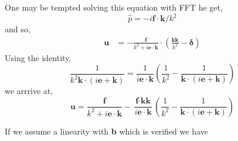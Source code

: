 One may be tempted solving this equation with FFT he get,
\begin{equation}
    \hat{p} = - i \textbf{f}\cdot \textbf{k} / k^2
\end{equation}
and so,
\begin{align}
    \textbf{u}
    &= -\frac{\textbf{f}}{k^2  + i \textbf{e}\cdot \textbf{k}}\cdot (\frac{\textbf{kk}}{k^2} - \bm\delta)
\end{align}
Using the identity,
\begin{equation}
    \frac{1}{k^2 \textbf{k}\cdot (i\textbf{e} + \textbf{k})}
    =\frac{1}{i\textbf{e}\cdot \textbf{k}}\left(\frac{1}{k^2} - \frac{1}{\textbf{k}\cdot (i\textbf{e}+\textbf{k})}\right)
\end{equation}
we arrrive at,
\begin{equation}
    \textbf{u}
    = \frac{\textbf{f}}{k^2  + i \textbf{e}\cdot \textbf{k}}
    -
    \frac{\textbf{f}\cdot \textbf{kk}}{i\textbf{e}\cdot \textbf{k}}\left(\frac{1}{k^2} - \frac{1}{\textbf{k}\cdot (i\textbf{e}+\textbf{k})}\right)
\end{equation}

If we assume a linearity with \textbf{b} which is verified \citet{pozrikidis2011introduction} we have

